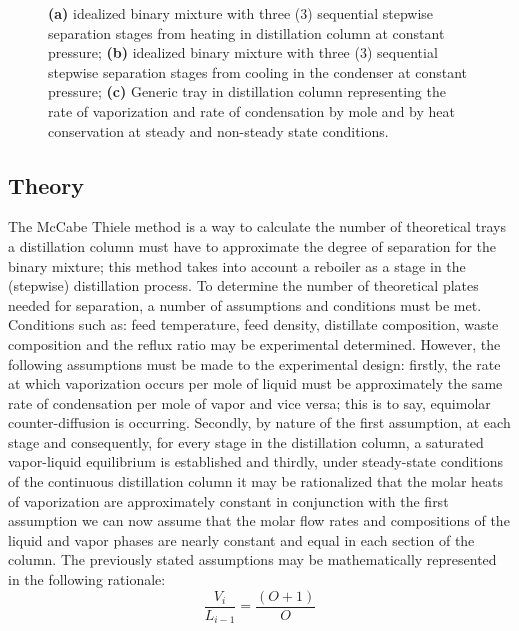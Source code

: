 \documentclass[peerreview, a4paper, 12pt]{IEEEtran}
\begin{document}
\begin{figure*}[]
\centering
{}\hspace{1em}
\caption{\textbf{(a)} idealized binary mixture with three (3) sequential stepwise separation stages from heating in distillation column at constant pressure; \textbf{(b)} idealized binary mixture with three (3) sequential stepwise separation stages from cooling in the condenser at constant pressure; \textbf{(c)} Generic tray in distillation column representing the rate of vaporization and rate of condensation by mole and by heat conservation at steady and non-steady state conditions.}
\label{fig1}
\end{figure*}

\subsection{{\textbf{Theory}}}
The McCabe Thiele method is a way to calculate the number of theoretical trays a distillation column must have to approximate the degree of separation for the binary mixture; this method takes into account a reboiler as a stage in the (stepwise) distillation process. To determine the number of theoretical plates needed for separation, a number of assumptions and conditions must be met. Conditions such as: feed temperature, feed density, distillate composition, waste composition and the reflux ratio may be experimental determined. However, the following assumptions must be made to the experimental design: firstly, the rate at which vaporization occurs per mole of liquid must be approximately the same rate of condensation per mole of vapor and vice versa; this is to say, equimolar counter-diffusion is occurring. Secondly, by nature of the first assumption, at each stage and consequently, for every stage in the distillation column, a saturated vapor-liquid equilibrium is established and thirdly, under steady-state conditions of the continuous distillation column it may be rationalized that the molar heats of vaporization are approximately constant in conjunction with the first assumption we can now assume that the molar flow rates and compositions of the liquid and vapor phases are nearly constant and equal in each section of the column. The previously stated assumptions may be mathematically represented in the following rationale:
\begin{equation}
\frac{V_i}{L_{i-1}} = \frac{({O+1})}{O}
\label{eq1}
\end{equation} 
\end{document}
